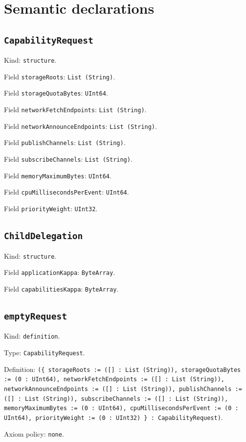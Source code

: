 \documentclass[11pt]{article}
\begin{document}
\section*{Semantic declarations}
\subsection*{\texttt{CapabilityRequest}}
\noindent Kind: \texttt{structure}.\par
\noindent Field \texttt{storageRoots}: \texttt{List (String)}.\par
\noindent Field \texttt{storageQuotaBytes}: \texttt{UInt64}.\par
\noindent Field \texttt{networkFetchEndpoints}: \texttt{List (String)}.\par
\noindent Field \texttt{networkAnnounceEndpoints}: \texttt{List (String)}.\par
\noindent Field \texttt{publishChannels}: \texttt{List (String)}.\par
\noindent Field \texttt{subscribeChannels}: \texttt{List (String)}.\par
\noindent Field \texttt{memoryMaximumBytes}: \texttt{UInt64}.\par
\noindent Field \texttt{cpuMillisecondsPerEvent}: \texttt{UInt64}.\par
\noindent Field \texttt{priorityWeight}: \texttt{UInt32}.\par
\subsection*{\texttt{ChildDelegation}}
\noindent Kind: \texttt{structure}.\par
\noindent Field \texttt{applicationKappa}: \texttt{ByteArray}.\par
\noindent Field \texttt{capabilitiesKappa}: \texttt{ByteArray}.\par
\subsection*{\texttt{emptyRequest}}
\noindent Kind: \texttt{definition}.\par
\noindent Type: \texttt{CapabilityRequest}.\par
\noindent Definition: \texttt{(\{ storageRoots := ([] : List (String)), storageQuotaBytes := (0 : UInt64), networkFetchEndpoints := ([] : List (String)), networkAnnounceEndpoints := ([] : List (String)), publishChannels := ([] : List (String)), subscribeChannels := ([] : List (String)), memoryMaximumBytes := (0 : UInt64), cpuMillisecondsPerEvent := (0 : UInt64), priorityWeight := (0 : UInt32) \} : CapabilityRequest)}.\par
\noindent Axiom policy: \texttt{none}.\par
\end{document}
